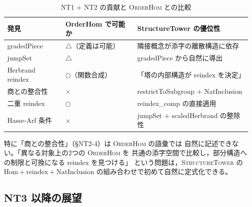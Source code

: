 \documentclass[a4paper,11pt]{ltjsarticle}
\theoremstyle{definition}
\theoremstyle{plain}
\theoremstyle{remark}
\begin{document}
\begin{table}[H]
\centering
\caption{NT1 + NT2 の貢献と \textsc{OrderHom} との比較}
\label{tab:contributions}
\renewcommand{\arraystretch}{1.3}
\begin{tabular}{p{3.5cm}p{2.5cm}p{5.5cm}}
\toprule
\textbf{発見} & \textbf{OrderHom で可能か} & \textbf{StructureTower の優位性} \\
\midrule
gradedPiece & \mbox{$\triangle$（定義は可能）} & 隣接概念が添字の離散構造に依存 \\
jumpSet & $\triangle$ & gradedPiece から自然に導出 \\
Herbrand reindex & $\bigcirc$（関数合成） & 「塔の内部構造が reindex を決定」 \\
商との整合性 & $\times$ & restrictToSubgroup + NatInclusion \\
二重 reindex & $\bigcirc$ & reindex\_comp の直接適用 \\
Hasse-Arf 条件 & $\times$ & jumpSet + scaledHerbrand の整除性 \\
\bottomrule
\end{tabular}
\end{table}

特に「商との整合性」（\S NT2-4）は \textsc{OrderHom} の語彙では
自然に記述できない。「異なる対象上の2つの \textsc{OrderHom} を
共通の添字空間で比較し，部分構造への制限と可換になる reindex を見つける」
という問題は，\textsc{StructureTower} の $\mathrm{Hom} + \mathrm{reindex} + \mathrm{NatInclusion}$
の組み合わせで初めて自然に定式化できる。

\subsection{NT3 以降の展望}
\end{document}
